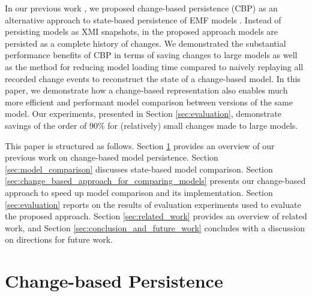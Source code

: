 \documentclass{jot}
\newcommand{\dk}[1]{\textcolor{blue}{\textbf{[Dimitris: #1]}}}
\begin{document}
    In our previous work \cite{DBLP:conf/models/YohannisKP17,yohannis2018towards,DBLP:conf/models/YohannisRPK18}, we proposed change-based persistence (CBP) as an alternative approach to state-based persistence of EMF models \cite{steinberg2008emf}. Instead of persisting models as XMI snapshots, in the proposed approach models are persisted as a complete history of changes. We demonstrated the substantial performance benefits of CBP in terms of saving changes to large models \cite{DBLP:conf/models/YohannisKP17} as well as the method for reducing model loading time compared to naively replaying all recorded change events \cite{DBLP:conf/models/YohannisRPK18} to reconstruct the state of a change-based model. 
    In this paper, we demonstrate how a change-based representation also enables much more efficient and performant model comparison between versions of the same model. Our experiments, presented in Section \ref{sec:evaluation}, demonstrate savings of the order of 90\% for (relatively) small changes made to large models.
    
    This paper is structured as follows. Section \ref{sec:change-based_persistence} provides an overview of our previous work on change-based model persistence. Section \ref{sec:model_comparison} discusses state-based model comparison. Section \ref{sec:change_based_approach_for_comparing_models} presents our change-based approach to speed up model comparison and its implementation. Section \ref{sec:evaluation} 
    reports on the results of evaluation experiments used to evaluate the proposed approach. Section \ref{sec:related_work} provides an overview of related work, and Section \ref{sec:conclusion_and_future_work} concludes with a discussion on directions for future work.
    
    \vspace{-10pt}
    \section{Change-based Persistence}
    \label{sec:change-based_persistence}
    
\end{document}
